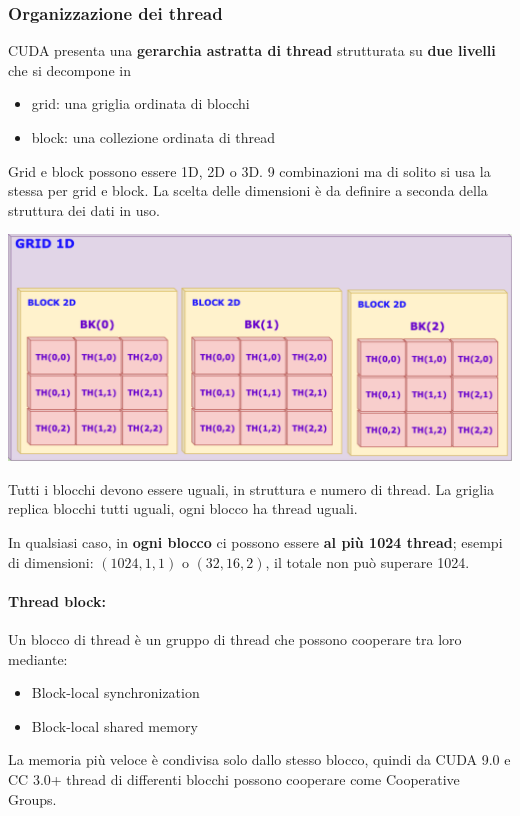 \subsubsection{Organizzazione dei thread}
CUDA presenta una \textbf{gerarchia astratta di thread} strutturata su \textbf{due livelli} che si decompone in 
\begin{itemize}
	\item grid: una griglia ordinata di blocchi
	\item block: una collezione ordinata di thread
\end{itemize}
Grid e block possono essere 1D, 2D o 3D. 9 combinazioni ma di solito si usa la stessa per grid e block. La scelta delle dimensioni è da definire a seconda della struttura dei dati in uso.
\begin{center}
	\includegraphics[width=0.98\linewidth]{img/modelli/grdiblock}
\end{center}

Tutti i blocchi devono essere uguali, in struttura e numero di thread. La griglia replica blocchi tutti uguali, ogni blocco ha thread uguali.

In qualsiasi caso, in \textbf{ogni blocco} ci possono essere \textbf{al più 1024 thread}; esempi di dimensioni: $(1024, 1, 1)$  o $(32, 16, 2)$, il totale non può superare 1024.\\

\paragraph{Thread block:} Un blocco di thread è un gruppo di thread che possono cooperare tra loro mediante:
\begin{itemize}
	\item Block-local synchronization
	\item Block-local shared memory
\end{itemize}

La memoria più veloce è condivisa solo dallo stesso blocco, quindi da CUDA 9.0 e CC 3.0+ thread di differenti blocchi possono cooperare come Cooperative Groups.\\

